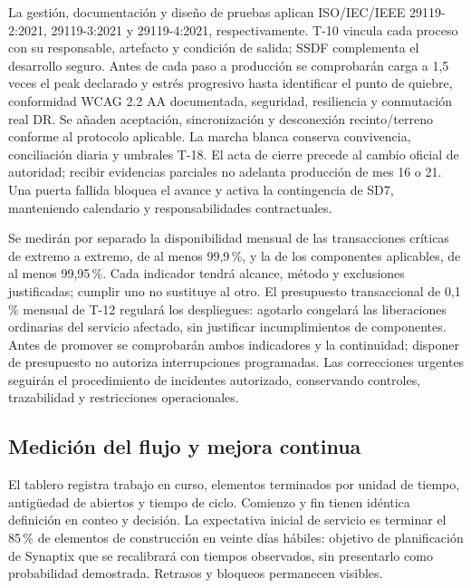 La gestión, documentación y diseño de pruebas aplican ISO/IEC/IEEE 29119-2:2021, 29119-3:2021 y 29119-4:2021, respectivamente. T-10 vincula cada proceso con su responsable, artefacto y condición de salida; SSDF complementa el desarrollo seguro. Antes de cada paso a producción se comprobarán carga a 1,5 veces el peak declarado y estrés progresivo hasta identificar el punto de quiebre, conformidad WCAG 2.2 AA documentada, seguridad, resiliencia y conmutación real DR. Se añaden aceptación, sincronización y desconexión recinto/terreno conforme al protocolo aplicable. La marcha blanca conserva convivencia, conciliación diaria y umbrales T-18. El acta de cierre precede al cambio oficial de autoridad; recibir evidencias parciales no adelanta producción de mes 16 o 21. Una puerta fallida bloquea el avance y activa la contingencia de SD7, manteniendo calendario y responsabilidades contractuales. \parencites[art.~4.3, pp.~5--6; art.~17.3, pp.~12--13]{sd6-ba}[cap.~20, pp.~34--35]{sd6-bt}{sd6-29119-2,sd6-29119-3,sd6-29119-4}[13.3, pp.~29--30]{sd6-c07}

Se medirán por separado la disponibilidad mensual de las transacciones críticas de extremo a extremo, de al menos 99,9\,\%, y la de los componentes aplicables, de al menos 99,95\,\%. Cada indicador tendrá alcance, método y exclusiones justificadas; cumplir uno no sustituye al otro. El presupuesto transaccional de 0,1\,\% mensual de T-12 regulará los despliegues: agotarlo congelará las liberaciones ordinarias del servicio afectado, sin justificar incumplimientos de componentes. Antes de promover se comprobarán ambos indicadores y la continuidad; disponer de presupuesto no autoriza interrupciones programadas. Las correcciones urgentes seguirán el procedimiento de incidentes autorizado, conservando controles, trazabilidad y restricciones operacionales. \parencites[RNF-DISP-01, p.~50; RT-10.09, p.~105]{sd6-t12}[RT-04.07, p.~11; RT-10.01/06/09, p.~22]{sd6-bt}

\subsection{Medición del flujo y mejora continua}
El tablero registra trabajo en curso, elementos terminados por unidad de tiempo, antigüedad de abiertos y tiempo de ciclo. Comienzo y fin tienen idéntica definición en conteo y decisión. La expectativa inicial de servicio es terminar el 85\,\% de elementos de construcción en veinte días hábiles: objetivo de planificación de Synaptix que se recalibrará con tiempos observados, sin presentarlo como probabilidad demostrada. Retrasos y bloqueos permanecen visibles. \parencite[Definition of Workflow y Flow Metrics, pp.~3--5]{sd6-kanban}

